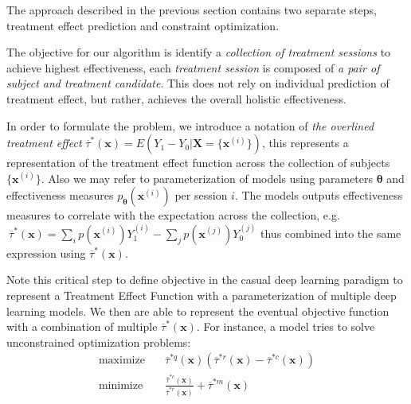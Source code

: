 \documentclass{article}
\begin{document}
The approach described in the previous section contains two separate steps, treatment effect prediction and constraint optimization. 

The objective for our algorithm is identify a \emph{collection of treatment sessions} to achieve highest effectiveness, each \emph{treatment session} is composed of \emph{a pair of subject and treatment candidate}. This does not rely on individual prediction of treatment effect, but rather, achieves the overall holistic effectiveness. %

In order to formulate the problem, we introduce a notation of \emph{the overlined treatment effect} $\overline{\tau}^{*}(\mathbf{x}) = E(Y_1 - Y_0 | \mathbf{X} = \{\mathbf{x}^{(i)}\})$, this represents a representation of the treatment effect function across the collection of subjects $\{\mathbf{x}^{(i)}\}$. Also we may refer to parameterization of models using parameters $\mathbf{\theta}$ and effectiveness measures $p_{\mathbf{\theta}}(\mathbf{x}^{(i)})$ per session $i$. The models outputs effectiveness measures to correlate with the expectation across the collection, e.g. $~\overline{\tau}^{*}(\mathbf{x}) = \sum_i p(\mathbf{x}^{(i)})Y_1^{(i)} - \sum_j p(\mathbf{x}^{(j)})Y_0^{(j)}$ thus combined into the same expression using $\overline{\tau}^{*}(\mathbf{x})$. 

Note this critical step to define objective in the casual deep learning paradigm to represent a Treatment Effect Function with a parameterization of multiple deep learning models. We then are able to represent the eventual objective function with a combination of multiple $\overline{\tau}^{*}(\mathbf{x})$. For instance, a model tries to solve unconstrained optimization problems: 
\begin{align} 
\label{eq:pstatement_unconstrained_opt} 
\text{maximize} \quad &\overline{\tau}^{*q}(\mathbf{x})(\overline{\tau}^{*r}(\mathbf{x}) - \overline{\tau}^{*c}(\mathbf{x})) \\ 
\text{minimize} \quad &\frac{\overline{\tau}^{*c}(\mathbf{x})}{\overline{\tau}^{*r}(\mathbf{x})} + \overline{\tau}^{*m}(\mathbf{x}) 
\end{align} 
\end{document}
